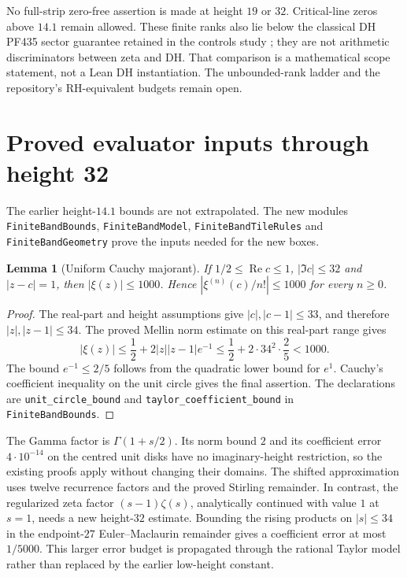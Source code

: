 \documentclass[11pt]{amsart}
\newtheorem{lemma}[theorem]{Lemma}
\newcommand{\Repart}{\operatorname{Re}}
\begin{document}
No full-strip zero-free assertion is made at height $19$ or $32$.
Critical-line zeros above $14.1$ remain allowed. These finite ranks also lie
below the classical DH PF435 sector guarantee retained in the controls study
\cite{dhcontrols}; they are not arithmetic discriminators between zeta and DH.
That comparison is a mathematical scope statement, not a Lean DH instantiation.
The unbounded-rank ladder and the repository's RH-equivalent budgets remain open.

\section{Proved evaluator inputs through height 32}\label{sec:height32}
The earlier height-$14.1$ bounds are not extrapolated. The new modules
\texttt{FiniteBandBounds}, \texttt{FiniteBandModel},
\texttt{FiniteBandTileRules} and \texttt{FiniteBandGeometry}
prove the inputs needed for the new boxes.

\begin{lemma}[Uniform Cauchy majorant]\label{lem:majorant32}
If $1/2\le\Repart c\le1$, $|\Im c|\le32$ and $|z-c|=1$, then
$|\xi(z)|\le1000$. Hence $|\xi^{(n)}(c)/n!|\le1000$ for every $n\ge0$.
\end{lemma}
\begin{proof}
The real-part and height assumptions give $|c|,|c-1|\le33$, and therefore
$|z|,|z-1|\le34$. The proved Mellin norm estimate on this real-part range gives
\[
 |\xi(z)|\le\frac12+2|z||z-1|e^{-1}
 \le\frac12+2\cdot34^2\cdot\frac25<1000.
\]
The bound $e^{-1}\le2/5$ follows from the quadratic lower bound for $e^1$.
Cauchy's coefficient inequality on the unit circle gives the final assertion.
The declarations are \texttt{unit\_circle\_bound} and
\texttt{taylor\_coefficient\_bound} in \texttt{FiniteBandBounds}.
\end{proof}

The Gamma factor is $\Gamma(1+s/2)$. Its norm bound $2$ and its coefficient
error $4\cdot10^{-14}$ on the centred unit disks have no imaginary-height
restriction, so the existing proofs apply without changing their domains.
The shifted approximation uses twelve recurrence factors and the proved
Stirling remainder. In contrast, the regularized zeta factor
$(s-1)\zeta(s)$, analytically continued with value $1$ at $s=1$, needs a new
height-$32$ estimate. Bounding the rising products on $|s|\le34$ in the
endpoint-$27$ Euler--Maclaurin remainder gives a coefficient error at most
$1/5000$. This larger error budget is propagated through the rational Taylor
model rather than replaced by the earlier low-height constant.
\end{document}
